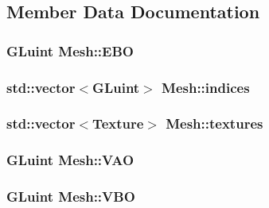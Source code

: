 \subsection{Member Data Documentation}
\subsubsection[{\texorpdfstring{E\+BO}{EBO}}]{\setlength{\rightskip}{0pt plus 5cm}G\+Luint Mesh\+::\+E\+BO\hspace{0.3cm}{\ttfamily [private]}}\hypertarget{classMesh_a894c6723c0172f4e38b2509582abfa6c}{}\label{classMesh_a894c6723c0172f4e38b2509582abfa6c}
\subsubsection[{\texorpdfstring{indices}{indices}}]{\setlength{\rightskip}{0pt plus 5cm}std\+::vector$<$G\+Luint$>$ Mesh\+::indices}\hypertarget{classMesh_a5e55b84c6c967608bcf23ed7d68e4215}{}\label{classMesh_a5e55b84c6c967608bcf23ed7d68e4215}
\subsubsection[{\texorpdfstring{textures}{textures}}]{\setlength{\rightskip}{0pt plus 5cm}std\+::vector$<${\bf Texture}$>$ Mesh\+::textures}\hypertarget{classMesh_abf1e672703bf4f8e104f3b076faaf958}{}\label{classMesh_abf1e672703bf4f8e104f3b076faaf958}
\subsubsection[{\texorpdfstring{V\+AO}{VAO}}]{\setlength{\rightskip}{0pt plus 5cm}G\+Luint Mesh\+::\+V\+AO\hspace{0.3cm}{\ttfamily [private]}}\hypertarget{classMesh_a09b989b9d4df8ae595d7e80e091a4a5b}{}\label{classMesh_a09b989b9d4df8ae595d7e80e091a4a5b}
\subsubsection[{\texorpdfstring{V\+BO}{VBO}}]{\setlength{\rightskip}{0pt plus 5cm}G\+Luint Mesh\+::\+V\+BO\hspace{0.3cm}{\ttfamily [private]}}\hypertarget{classMesh_a0d28b2c6fee628a13f43cae3f858569b}{}\label{classMesh_a0d28b2c6fee628a13f43cae3f858569b}
